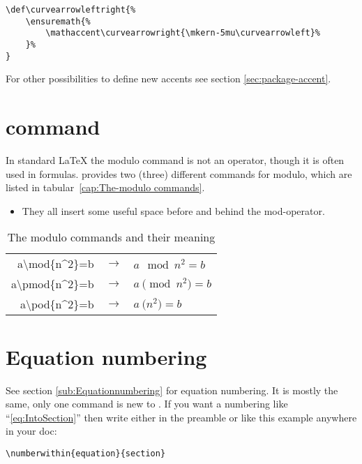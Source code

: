 \begin{table}[htb]
\begin{lstlisting}
\def\curvearrowleftright{%
	\ensuremath{%
		\mathaccent\curvearrowright{\mkern-5mu\curvearrowleft}%
	}%
}
\end{lstlisting}

For other possibilities to define new accents see section \vref{sec:package-accent}.    %

\section{ command}

In standard \LaTeX{} the modulo command is not an operator, though    %
it is often used in formulas. \AmSmath provides two (three) different
commands for modulo, which are listed in tabular~\vref{cap:The-modulo commands}.

\begin{itemize}
\item They all insert some useful space before and behind the mod-operator.
\end{itemize}

\begin{table}[htb]
\centering\begin{tabular}{rrl}
a\textbackslash{}mod\{n\^{}2\}=b&
$\rightarrow$&
$a\mod{n^{2}}=b$\tabularnewline
a\textbackslash{}pmod\{n\^{}2\}=b&
$\rightarrow$&
$a\pmod{n^{2}}=b$\tabularnewline
a\textbackslash{}pod\{n\^{}2\}=b&
$\rightarrow$&
$a\pod{n^{2}}=b$\tabularnewline
\end{tabular}
\caption{\label{cap:The-modulo commands}The modulo commands and their meaning}
\end{table}



\section{Equation numbering\label{sec:Equation-numbering}}

See section \vref{sub:Equationnumbering} for equation numbering.
It is mostly the %
same, only one command is new to \AmSmath. If you want
a numbering like ``\ref{eq:IntoSection}{}'' then write either in the preamble    %
or like this example anywhere in your doc:

\begin{lstlisting}
\numberwithin{equation}{section}
\end{lstlisting}


\end{table}
